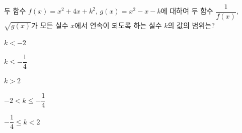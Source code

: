 두 함수 $f(x)=x^2+4x+k^2$, $g(x)=x^2-x-k$에 대하여 두 함수 $\dfrac{1}{f(x)}$, $\sqrt{g(x)}$가 모든 실수 $x$에서 연속이 되도록 하는 실수 $k$의 값의 범위는?
\begin{choices32}{\rule[-3ex]{0pt}{8ex}$k<-2$}{\rule[-3ex]{0pt}{8ex}$k\le -\dfrac{1}{4}$}{\rule[-3ex]{0pt}{8ex}$k>2$}{\rule[-3ex]{0pt}{8ex}$-2<k\le -\dfrac{1}{4}$}{\rule[-3ex]{0pt}{8ex}$-\dfrac{1}{4}\le k<2$}\end{choices32}
